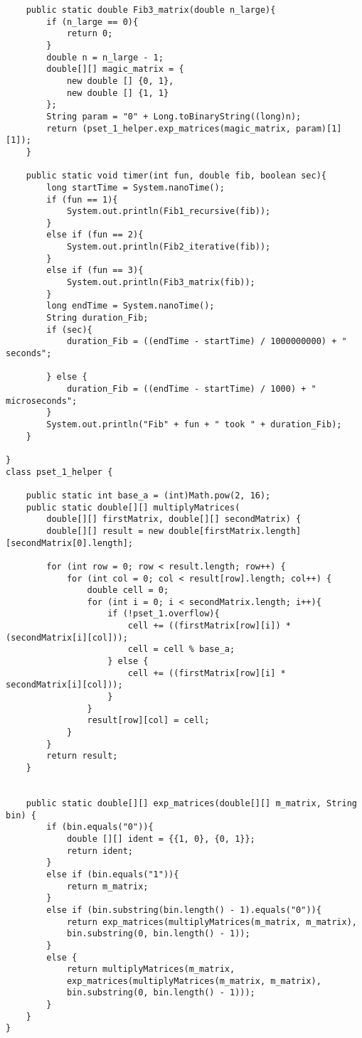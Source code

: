 \documentclass[11pt, solution, letterpaper]{format}
\begin{document}
\begin{lstlisting}
    public static double Fib3_matrix(double n_large){
        if (n_large == 0){
            return 0;
        }
        double n = n_large - 1;
        double[][] magic_matrix = {
            new double [] {0, 1},
            new double [] {1, 1}
        };
        String param = "0" + Long.toBinaryString((long)n);
        return (pset_1_helper.exp_matrices(magic_matrix, param)[1][1]);
    }

    public static void timer(int fun, double fib, boolean sec){
        long startTime = System.nanoTime();
        if (fun == 1){
            System.out.println(Fib1_recursive(fib));
        }
        else if (fun == 2){
            System.out.println(Fib2_iterative(fib));
        }
        else if (fun == 3){
            System.out.println(Fib3_matrix(fib));
        } 
        long endTime = System.nanoTime();
        String duration_Fib;
        if (sec){
            duration_Fib = ((endTime - startTime) / 1000000000) + " seconds";
            
        } else {
            duration_Fib = ((endTime - startTime) / 1000) + " microseconds";
        }
        System.out.println("Fib" + fun + " took " + duration_Fib);
    }

}
class pset_1_helper {

    public static int base_a = (int)Math.pow(2, 16);
    public static double[][] multiplyMatrices(
        double[][] firstMatrix, double[][] secondMatrix) {
        double[][] result = new double[firstMatrix.length][secondMatrix[0].length];
     
        for (int row = 0; row < result.length; row++) {
            for (int col = 0; col < result[row].length; col++) {
                double cell = 0;
                for (int i = 0; i < secondMatrix.length; i++){
                    if (!pset_1.overflow){              
                        cell += ((firstMatrix[row][i]) * (secondMatrix[i][col])); 
                        cell = cell % base_a;
                    } else {
                        cell += ((firstMatrix[row][i] * secondMatrix[i][col]));
                    }
                }
                result[row][col] = cell;
            }
        }
        return result;
    }

    
    public static double[][] exp_matrices(double[][] m_matrix, String bin) {
        if (bin.equals("0")){
            double [][] ident = {{1, 0}, {0, 1}};
            return ident;
        }
        else if (bin.equals("1")){
            return m_matrix;
        }
        else if (bin.substring(bin.length() - 1).equals("0")){
            return exp_matrices(multiplyMatrices(m_matrix, m_matrix),
            bin.substring(0, bin.length() - 1));
        }
        else {
            return multiplyMatrices(m_matrix,
            exp_matrices(multiplyMatrices(m_matrix, m_matrix),
            bin.substring(0, bin.length() - 1)));
        }
    }
}
\end{lstlisting}
\end{document}
